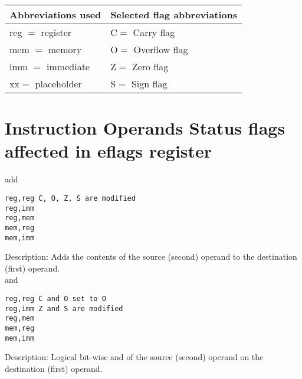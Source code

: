 \documentclass[10pt]{article}
\begin{document}
\begin{center}
\begin{tabular}{|l|l|}
\hline
Abbreviations used & Selected flag abbreviations \\
\hline
reg $=$ register & $\mathrm{C}=$ Carry flag \\
\hline
mem $=$ memory & $\mathrm{O}=$ Overflow flag \\
\hline
imm $=$ immediate & $\mathrm{Z}=$ Zero flag \\
\hline
$\mathrm{xx}=$ placeholder & $\mathrm{S}=$ Sign flag \\
\hline
\end{tabular}
\end{center}

\section*{Instruction Operands Status flags affected in eflags register}
add

\begin{verbatim}
reg,reg C, O, Z, S are modified
reg,imm
reg,mem
mem,reg
mem,imm
\end{verbatim}

Description: Adds the contents of the source (second) operand to the destination (first) operand.\\
and

\begin{verbatim}
reg,reg C and O set to O
reg,imm Z and S are modified
reg,mem
mem,reg
mem,imm
\end{verbatim}

Description: Logical bit-wise and of the source (second) operand on the destination (first) operand.
\end{document}
